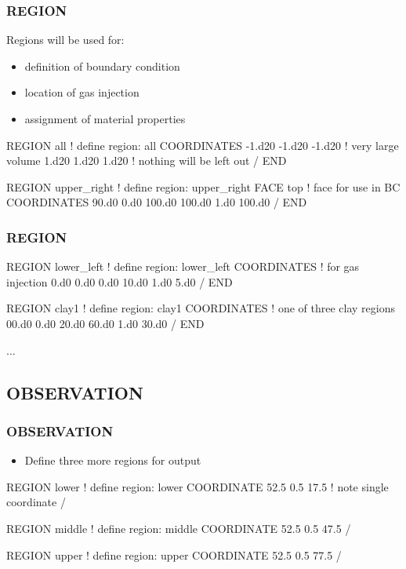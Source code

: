 \documentclass{beamer}
\newcommand\redcomment[1]{{{\color{red} #1}}}
\newcommand\bluecomment[1]{{{\color{blue} #1}}}
\newcommand\greencomment[1]{{{\color{green} #1}}}
\begin{document}
\begin{frame}[fragile]\frametitle{REGION}
Regions will be used for:
\begin{itemize}
  \item{definition of \redcomment{boundary condition}}
  \item{location of \redcomment{gas injection}}
  \item{assignment of \redcomment{material properties}}
\end{itemize}

\begin{semiverbatim}\small
REGION all               \bluecomment{! define region:} \greencomment{all}
  COORDINATES
    -1.d20 -1.d20 -1.d20 \bluecomment{! very large volume}
     1.d20  1.d20  1.d20 \bluecomment{! nothing will be left out}
  /
END

REGION upper_right       \bluecomment{! define region:} \greencomment{upper_right}
  FACE top               \bluecomment{! face for use in BC}
  COORDINATES
    90.d0 0.d0 100.d0
    100.d0 1.d0 100.d0
  /
END
\end{semiverbatim}
\end{frame}

\begin{frame}[fragile]\frametitle{REGION}

\begin{semiverbatim}\small
REGION lower_left        \bluecomment{! define region:} \greencomment{lower_left}
  COORDINATES            \bluecomment{! for gas injection}
    0.d0 0.d0 0.d0
    10.d0 1.d0 5.d0
  /
END

REGION clay1             \bluecomment{! define region:} \greencomment{clay1}
  COORDINATES            \bluecomment{! one of three clay regions}
    00.d0 0.d0 20.d0
    60.d0 1.d0 30.d0
  /
END

...

\end{semiverbatim}
  
\end{frame}
\subsection{OBSERVATION}

\begin{frame}[fragile]\frametitle{OBSERVATION}
\begin{itemize}
  \item{Define three more regions for \redcomment{output}}
\end{itemize}

\begin{semiverbatim}\small
REGION lower \bluecomment{! define region:} \greencomment{lower}
  COORDINATE 52.5 0.5 17.5 \bluecomment{! note single coordinate}
/

REGION middle \bluecomment{! define region:} \greencomment{middle}
  COORDINATE 52.5 0.5 47.5
/

REGION upper \bluecomment{! define region:} \greencomment{upper}
  COORDINATE 52.5 0.5 77.5
/
\end{semiverbatim}
\end{frame}
\end{document}
